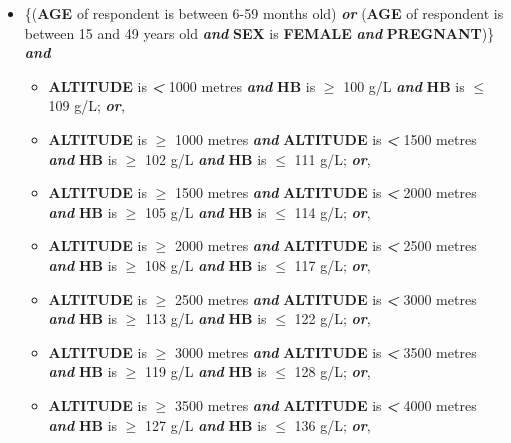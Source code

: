 \documentclass[12pt,a4paper]{article}
\begin{document}
\begin{itemize}
\item
  \{(\textbf{AGE} of respondent is between 6-59 months old) \textbf{\emph{or}} (\textbf{AGE} of respondent is between 15 and 49 years old \textbf{\emph{and}} \textbf{SEX} is \textbf{FEMALE} \textbf{\emph{and}} \textbf{PREGNANT})\} \textbf{\emph{and}}

  \begin{itemize}
  \item
    \textbf{ALTITUDE} is \textbf{\emph{\textless{}}} 1000 metres \textbf{\emph{and}} \textbf{HB} is \textbf{\emph{\(\geq\)}} 100 g/L \textbf{\emph{and}} \textbf{HB}
    is \textbf{\emph{\(\leq\)}} 109 g/L; \textbf{\emph{or}},
  \item
    \textbf{ALTITUDE} is \textbf{\emph{\(\geq\)}} 1000 metres \textbf{\emph{and}} \textbf{ALTITUDE} is \textbf{\emph{\textless{}}} 1500 metres \textbf{\emph{and}} \textbf{HB} is \textbf{\emph{\(\geq\)}} 102 g/L \textbf{\emph{and}} \textbf{HB} is \textbf{\emph{\(\leq\)}} 111 g/L; \textbf{\emph{or}},
  \item
    \textbf{ALTITUDE} is \textbf{\emph{\(\geq\)}} 1500 metres \textbf{\emph{and}} \textbf{ALTITUDE} is \textbf{\emph{\textless{}}} 2000 metres \textbf{\emph{and}} \textbf{HB} is \textbf{\emph{\(\geq\)}} 105 g/L \textbf{\emph{and}} \textbf{HB} is \textbf{\emph{\(\leq\)}} 114 g/L; \textbf{\emph{or}},
  \item
    \textbf{ALTITUDE} is \textbf{\emph{\(\geq\)}} 2000 metres \textbf{\emph{and}} \textbf{ALTITUDE} is \textbf{\emph{\textless{}}} 2500 metres \textbf{\emph{and}} \textbf{HB} is \textbf{\emph{\(\geq\)}} 108 g/L \textbf{\emph{and}} \textbf{HB} is \textbf{\emph{\(\leq\)}} 117 g/L; \textbf{\emph{or}},
  \item
    \textbf{ALTITUDE} is \textbf{\emph{\(\geq\)}} 2500 metres \textbf{\emph{and}} \textbf{ALTITUDE} is \textbf{\emph{\textless{}}} 3000 metres \textbf{\emph{and}} \textbf{HB} is \textbf{\emph{\(\geq\)}} 113 g/L \textbf{\emph{and}} \textbf{HB} is \textbf{\emph{\(\leq\)}} 122 g/L; \textbf{\emph{or}},
  \item
    \textbf{ALTITUDE} is \textbf{\emph{\(\geq\)}} 3000 metres \textbf{\emph{and}} \textbf{ALTITUDE} is \textbf{\emph{\textless{}}} 3500 metres \textbf{\emph{and}} \textbf{HB} is \textbf{\emph{\(\geq\)}} 119 g/L \textbf{\emph{and}} \textbf{HB} is \textbf{\emph{\(\leq\)}} 128 g/L; \textbf{\emph{or}},
  \item
    \textbf{ALTITUDE} is \textbf{\emph{\(\geq\)}} 3500 metres \textbf{\emph{and}} \textbf{ALTITUDE} is \textbf{\emph{\textless{}}} 4000 metres \textbf{\emph{and}} \textbf{HB} is \textbf{\emph{\(\geq\)}} 127 g/L \textbf{\emph{and}} \textbf{HB} is \textbf{\emph{\(\leq\)}} 136 g/L; \textbf{\emph{or}},

\end{itemize}
\end{itemize}
\end{document}
